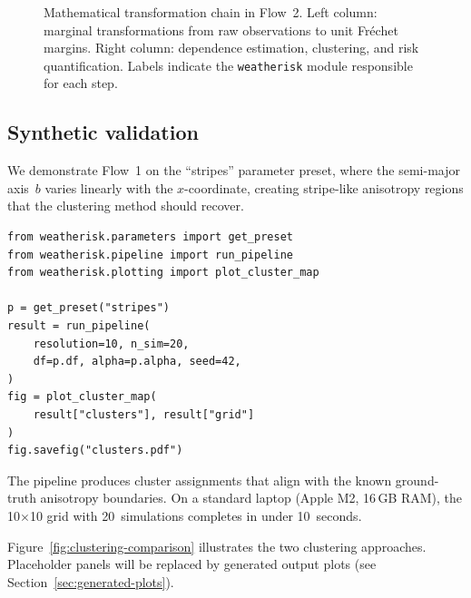 \documentclass[a4paper]{elsarticle}
\begin{document}
\begin{figure}[ht]
\caption{Mathematical transformation chain in Flow~2.
  Left column: marginal transformations from raw observations to
  unit Fr\'{e}chet margins.
  Right column: dependence estimation, clustering, and risk quantification.
  Labels indicate the \texttt{weatherisk} module responsible for each step.}
\label{fig:math-workflow}
\end{figure}

\subsection{Synthetic validation}

We demonstrate Flow~1 on the ``stripes'' parameter preset, where the
semi-major axis~$b$ varies linearly with the $x$-coordinate, creating
stripe-like anisotropy regions that the clustering method should recover.

\begin{lstlisting}[caption={Python API usage for synthetic validation.},label=lst:api]
from weatherisk.parameters import get_preset
from weatherisk.pipeline import run_pipeline
from weatherisk.plotting import plot_cluster_map

p = get_preset("stripes")
result = run_pipeline(
    resolution=10, n_sim=20,
    df=p.df, alpha=p.alpha, seed=42,
)
fig = plot_cluster_map(
    result["clusters"], result["grid"]
)
fig.savefig("clusters.pdf")
\end{lstlisting}

The pipeline produces cluster assignments that align with the known
ground-truth anisotropy boundaries.
On a standard laptop (Apple M2, 16\,GB RAM), the 10$\times$10 grid
with 20~simulations completes in under 10~seconds.

Figure~\ref{fig:clustering-comparison} illustrates the two clustering
approaches.
Placeholder panels will be replaced by generated output plots
(see Section~\ref{sec:generated-plots}).
\end{document}
